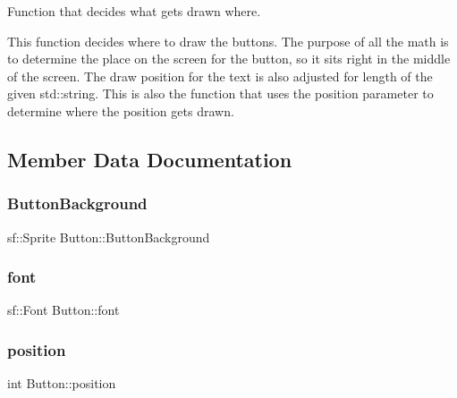 Function that decides what gets drawn where. 

This function decides where to draw the buttons. The purpose of all the math is to determine the place on the screen for the button, so it sits right in the middle of the screen. The draw position for the text is also adjusted for length of the given std\+::string. This is also the function that uses the position parameter to determine where the position gets drawn. 

\subsection{Member Data Documentation}
\mbox{\label{class_button_ab1ca1099a4726cdb09a7abd641685a6a}} 
\subsubsection{\texorpdfstring{Button\+Background}{ButtonBackground}}
{\footnotesize\ttfamily sf\+::\+Sprite Button\+::\+Button\+Background\hspace{0.3cm}{\ttfamily [private]}}

\mbox{\label{class_button_ab6290d275363f4b0e133eec450845ca1}} 
\subsubsection{\texorpdfstring{font}{font}}
{\footnotesize\ttfamily sf\+::\+Font Button\+::font\hspace{0.3cm}{\ttfamily [private]}}

\mbox{\label{class_button_a6853c434f05010c4b2582fb757f96bef}} 
\subsubsection{\texorpdfstring{position}{position}}
{\footnotesize\ttfamily int Button\+::position\hspace{0.3cm}{\ttfamily [private]}}

\mbox{\label{class_button_a954fb7025b688b7b2a4d8d16adca74eb}} 
